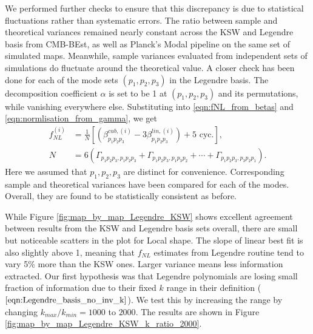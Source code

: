 We performed further checks to ensure that this discrepancy is due to statistical fluctuations rather than systematic errors. The ratio between sample and theoretical variances remained nearly constant across the KSW and Legendre basis from CMB-BEst, as well as Planck's Modal pipeline on the same set of simulated maps. Meanwhile, sample variances evaluated from independent sets of simulations do fluctuate around the theoretical value. A closer check has been done for each of the mode sets $(p_1,p_2,p_3)$ in the Legendre basis. The decomposition coefficient $\alpha$ is set to be 1 at $(p_1,p_2,p_3)$ and its permutations, while vanishing everywhere else. Substituting into \eqref{eqn:fNL_from_betas} and \eqref{eqn:normlisation_from_gamma}, we get
\begin{align}
	f_{NL}^{(i)} &= \frac{1}{N} \left[ \left( \beta^{cub,(i)}_{p_1 p_2 p_3} - 3 \beta^{lin,(i)}_{p_1 p_2 p_3} \right) + \text{5 cyc.} \right], \\
	N &= 6\left( \Gamma_{p_1 p_2 p_3, p_1 p_2 p_3} + \Gamma_{p_1 p_2 p_3, p_1 p_3 p_2} + \cdots + \Gamma_{p_1 p_2 p_3, p_3 p_2 p_1} \right).
\end{align}
Here we assumed that $p_1,p_2,p_3$ are distinct for convenience. Corresponding sample and theoretical variances have been compared for each of the modes. Overall, they are found to be statistically consistent as before.


While Figure \ref{fig:map_by_map_Legendre_KSW} shows excellent agreement between results from the KSW and Legendre basis sets overall, there are small but noticeable scatters in the plot for Local shape. The slope of linear best fit is also slightly above 1, meaning that $f_{NL}$ estimates from Legendre routine tend to vary 5\% more than the KSW ones. Larger variance means less information extracted. Our first hypothesis was that Legendre polynomials are losing small fraction of information due to their fixed $k$ range in their definition ($\ref{eqn:Legendre_basis_no_inv_k}$). We test this by increasing the range by changing $k_{max}/k_{min} = 1000$ to $2000$. The results are shown in Figure \ref{fig:map_by_map_Legendre_KSW_k_ratio_2000}.

